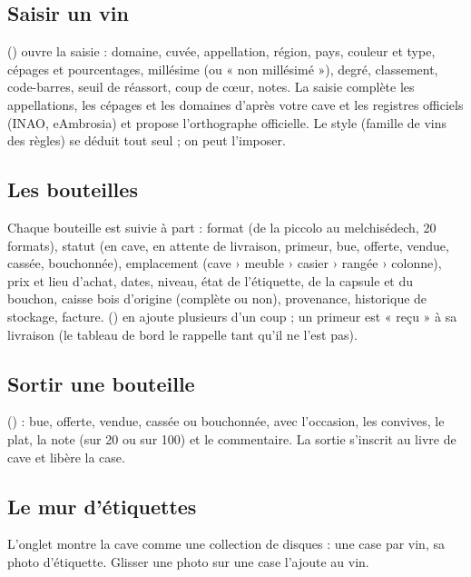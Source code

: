 \documentclass[11pt,a4paper]{article}
\begin{document}

\subsection{Saisir un vin}
 () ouvre la saisie : domaine, cuvée, appellation, région, pays,
couleur et type, cépages et pourcentages, millésime (ou « non millésimé »), degré, classement,
code-barres, seuil de réassort, coup de cœur, notes. La saisie complète les appellations, les cépages et
les domaines d'après votre cave et les registres officiels (INAO, eAmbrosia) et propose l'orthographe
officielle. Le style (famille de vins des règles) se déduit tout seul ; on peut l'imposer.


\subsection{Les bouteilles}
Chaque bouteille est suivie à part : format (de la piccolo au melchisédech, 20 formats), statut (en cave,
en attente de livraison, primeur, bue, offerte, vendue, cassée, bouchonnée), emplacement (cave › meuble ›
casier › rangée › colonne), prix et lieu d'achat, dates, niveau, état de l'étiquette, de la capsule et du
bouchon, caisse bois d'origine (complète ou non), provenance, historique de stockage, facture.
 () en ajoute plusieurs d'un coup ; un primeur est
« reçu » à sa livraison (le tableau de bord le rappelle tant qu'il ne l'est pas).


\subsection{Sortir une bouteille}
 () : bue, offerte, vendue, cassée ou
bouchonnée, avec l'occasion, les convives, le plat, la note (sur 20 ou sur 100) et le commentaire. La
sortie s'inscrit au livre de cave et libère la case.


\subsection{Le mur d'étiquettes}
L'onglet  montre la cave comme une collection de disques : une case par vin, sa
photo d'étiquette. Glisser une photo sur une case l'ajoute au vin.
\end{document}
